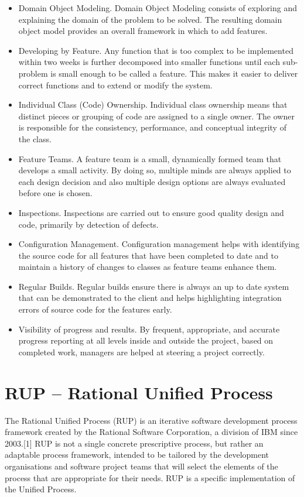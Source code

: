\begin{itemize}
\item Domain Object Modeling. Domain Object Modeling consists of exploring and explaining the domain of the problem to be solved. The resulting domain object model provides an overall framework in which to add features.
\item Developing by Feature. Any function that is too complex to be implemented within two weeks is further decomposed into smaller functions until each sub-problem is small enough to be called a feature. This makes it easier to deliver correct functions and to extend or modify the system.
\item Individual Class (Code) Ownership. Individual class ownership means that distinct pieces or grouping of code are assigned to a single owner. The owner is responsible for the consistency, performance, and conceptual integrity of the class.
\item Feature Teams. A feature team is a small, dynamically formed team that develops a small activity. By doing so, multiple minds are always applied to each design decision and also multiple design options are always evaluated before one is chosen.
\item Inspections. Inspections are carried out to ensure good quality design and code, primarily by detection of defects.
\item Configuration Management. Configuration management helps with identifying the source code for all features that have been completed to date and to maintain a history of changes to classes as feature teams enhance them.
\item Regular Builds. Regular builds ensure there is always an up to date system that can be demonstrated to the client and helps highlighting integration errors of source code for the features early.
\item Visibility of progress and results. By frequent, appropriate, and accurate progress reporting at all levels inside and outside the project, based on completed work, managers are helped at steering a project correctly.
\end{itemize}

\section{RUP -- Rational Unified Process}

The Rational Unified Process (RUP) is an iterative software development process framework created by the Rational Software Corporation, a division of IBM since 2003.[1] RUP is not a single concrete prescriptive process, but rather an adaptable process framework, intended to be tailored by the development organisations and software project teams that will select the elements of the process that are appropriate for their needs. RUP is a specific implementation of the Unified Process.

